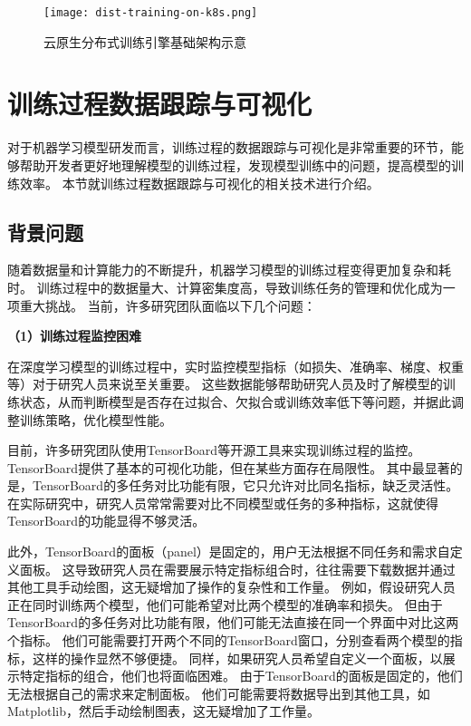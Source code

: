 \begin{figure}
  \centering
  \texttt{[image: dist-training-on-k8s.png]}
  \caption{云原生分布式训练引擎基础架构示意}
  \label{fig:disttrainingk8s}
\end{figure}


\section{训练过程数据跟踪与可视化}

对于机器学习模型研发而言，训练过程的数据跟踪与可视化是非常重要的环节，能够帮助开发者更好地理解模型的训练过程，发现模型训练中的问题，提高模型的训练效率。
本节就训练过程数据跟踪与可视化的相关技术进行介绍。

\subsection{背景问题}

随着数据量和计算能力的不断提升，机器学习模型的训练过程变得更加复杂和耗时。
训练过程中的数据量大、计算密集度高，导致训练任务的管理和优化成为一项重大挑战。
当前，许多研究团队面临以下几个问题：

\textbf{（1）训练过程监控困难}

在深度学习模型的训练过程中，实时监控模型指标（如损失、准确率、梯度、权重等）对于研究人员来说至关重要。
这些数据能够帮助研究人员及时了解模型的训练状态，从而判断模型是否存在过拟合、欠拟合或训练效率低下等问题，并据此调整训练策略，优化模型性能。

目前，许多研究团队使用TensorBoard等开源工具来实现训练过程的监控。
TensorBoard提供了基本的可视化功能，但在某些方面存在局限性。
其中最显著的是，TensorBoard的多任务对比功能有限，它只允许对比同名指标，缺乏灵活性。
在实际研究中，研究人员常常需要对比不同模型或任务的多种指标，这就使得TensorBoard的功能显得不够灵活。

此外，TensorBoard的面板（panel）是固定的，用户无法根据不同任务和需求自定义面板。
这导致研究人员在需要展示特定指标组合时，往往需要下载数据并通过其他工具手动绘图，这无疑增加了操作的复杂性和工作量。
例如，假设研究人员正在同时训练两个模型，他们可能希望对比两个模型的准确率和损失。
但由于TensorBoard的多任务对比功能有限，他们可能无法直接在同一个界面中对比这两个指标。
他们可能需要打开两个不同的TensorBoard窗口，分别查看两个模型的指标，这样的操作显然不够便捷。
同样，如果研究人员希望自定义一个面板，以展示特定指标的组合，他们也将面临困难。
由于TensorBoard的面板是固定的，他们无法根据自己的需求来定制面板。
他们可能需要将数据导出到其他工具，如Matplotlib，然后手动绘制图表，这无疑增加了工作量。

